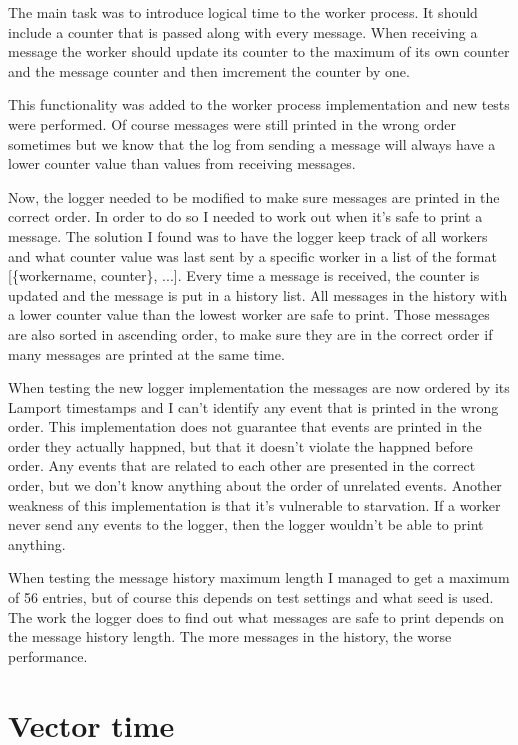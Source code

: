 \documentclass[a4paper, 11pt]{article}
\begin{document}
The main task was to introduce logical time to the worker process. It should include a counter that is passed along with every message. When receiving a message the worker should update its counter to the maximum of its own counter and the message counter and then imcrement the counter by one. 

This functionality was added to the worker process implementation and new tests were performed. Of course messages were still printed in the wrong order sometimes but we know that the log from sending a message will always have a lower counter value than values from receiving messages.

Now, the logger needed to be modified to make sure messages are printed in the correct order. In order to do so I needed to work out when it's safe to print a message. The solution I found was to have the logger keep track of all workers and what counter value was last sent by a specific worker in a list of the format [\{workername, counter\}, ...]. Every time a message is received, the counter is updated and the message is put in a history list. All messages in the history with a lower counter value than the lowest worker are safe to print. Those messages are also sorted in ascending order, to make sure they are in the correct order if many messages are printed at the same time. 

When testing the new logger implementation the messages are now ordered by its Lamport timestamps and I can't identify any event that is printed in the wrong order. This implementation does not guarantee that events are printed in the order they actually happned, but that it doesn't violate the happned before order. Any events that are related to each other are presented in the correct order, but we don't know anything about the order of unrelated events. Another weakness of this implementation is that it's vulnerable to starvation. If a worker never send any events to the logger, then the logger wouldn't be able to print anything. 

When testing the message history maximum length I managed to get a maximum of 56 entries, but of course this depends on test settings and what seed is used. The work the logger does to find out what messages are safe to print depends on the message history length. The more messages in the history, the worse performance.

\section{Vector time}
\end{document}
